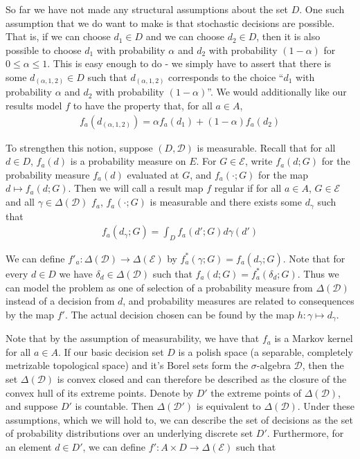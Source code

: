 So far we have not made any structural assumptions about the set $D$. One such assumption that we do want to make is that stochastic decisions are possible. That is, if we can choose $d_1\in D$ and we can choose $d_2 \in D$, then it is also possible to choose $d_1$ with probability $\alpha$ and $d_2$ with probability $(1-\alpha)$ for $0\leq \alpha \leq 1$. This is easy enough to do - we simply have to assert that there is some $d_{(\alpha,1,2)}\in D$ such that $d_{(\alpha,1,2)}$ corresponds to the choice ``$d_1$ with probability $\alpha$ and $d_2$ with probability $(1-\alpha)$''. We would additionally like our results model $f$ to have the property that, for all $a\in A$, 
\begin{align}
	f_a(d_{(\alpha,1,2)}) = \alpha f_a(d_1) + (1-\alpha) f_a(d_2) \label{eq:convexity_or_something}
\end{align}

To strengthen this notion, suppose $(D,\mathcal{D})$ is measurable. Recall that for all $d\in D$, $f_a(d)$ is a probability measure on $E$. For $G\in \mathcal{E}$, write $f_a(d;G)$ for the probability measure $f_a(d)$ evaluated at $G$, and $f_a(\cdot;G)$ for the map $d\mapsto f_a(d;G)$. Then we will call a result map $f$ regular if for all $a\in A$, $G\in \mathcal{E}$ and all $\gamma\in \Delta(\mathcal{D})$ $f_a$, $f_a(\cdot;G)$ is measurable and there exists some $d_\gamma$ such that
\begin{align}
	f_a(d_\gamma;G) = \int_D f_a(d';G) d\gamma(d') \label{eq:strong_convexit_or_something}
\end{align}

We can define $f'_a:\Delta(\mathcal{D})\to \Delta(\mathcal{E})$ by $f^*_a(\gamma;G) = f_a(d_\gamma;G)$. Note that for every $d\in D$ we have $\delta_d\in \Delta(\mathcal{D})$ such that $f_a(d;G) = f^*_a(\delta_d;G)$. Thus we can model the problem as one of selection of a probability measure from $\Delta(\mathcal{D})$ instead of a decision from $d$, and probability measures are related to consequences by the map $f'$. The actual decision chosen can be found by the map $h:\gamma\mapsto d_\gamma$.

Note that by the assumption of measurability, we have that $f_a$ is a Markov kernel for all $a\in A$. If our basic decision set $D$ is a polish space (a separable, completely metrizable topological space) and it's Borel sets form the $\sigma$-algebra $\mathcal{D}$, then the set $\Delta(\mathcal{D})$ is convex closed and can therefore be described as the closure of the convex hull of its extreme points. Denote by $D'$ the extreme points of $\Delta(\mathcal{D})$, and suppose $D'$ is countable. Then $\Delta(\mathcal{D}')$ is equivalent to $\Delta(\mathcal{D})$. Under these assumptions, which we will hold to, we can describe the set of decisions as the set of probability distributions over an underlying discrete set $D'$. Furthermore, for an element $d\in D'$, we can define $f':A\times D\to \Delta(\mathcal{E})$ such that

